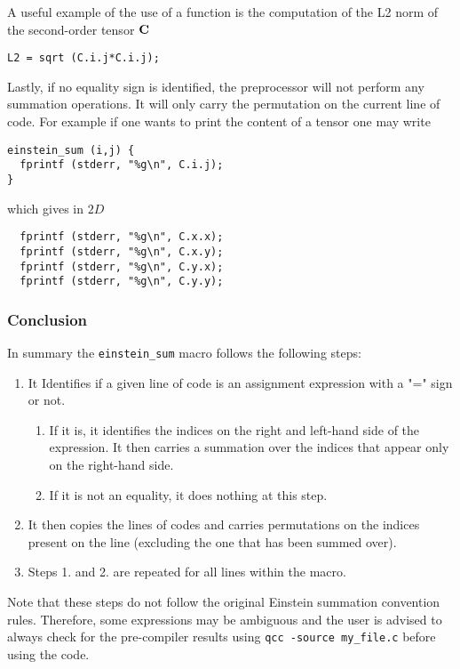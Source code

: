 A useful example of the use of a function is the computation of the L2 norm of the second-order tensor $\textbf C$

\begin{lstlisting}
L2 = sqrt (C.i.j*C.i.j);
\end{lstlisting}

Lastly, if no equality sign is identified, the preprocessor will not perform any summation operations. It will only carry the permutation on the current line of code. For example if one wants to print the content of a tensor one may write 

\begin{lstlisting}
einstein_sum (i,j) {
  fprintf (stderr, "%g\n", C.i.j);
}
\end{lstlisting}

which gives in $2D$

\begin{lstlisting}
  fprintf (stderr, "%g\n", C.x.x);
  fprintf (stderr, "%g\n", C.x.y);
  fprintf (stderr, "%g\n", C.y.x);
  fprintf (stderr, "%g\n", C.y.y);
\end{lstlisting}

\subsubsection{Conclusion}

In summary the \texttt{einstein\_sum} macro follows the following steps:

\begin{enumerate}
    \item  It Identifies if a given line of code is an assignment expression with a "=" sign or not. 
    \begin{enumerate}
    \item If it is, it identifies the indices on the right and left-hand side of the expression. 
       It then carries a summation over the indices that appear only on the right-hand side. 
    \item If it is not an equality, it does nothing at this step. 
    \end{enumerate}
    \item  It then copies the lines of codes and carries permutations on the indices present on the line (excluding the one that has been summed over). 
    \item Steps 1. and 2. are repeated for all lines within the macro. 
\end{enumerate}

Note that these steps do not follow the original Einstein summation convention rules. 
Therefore, some expressions may be ambiguous and the user is advised to always check for the pre-compiler results using \texttt{qcc -source my\_file.c} before using the code.